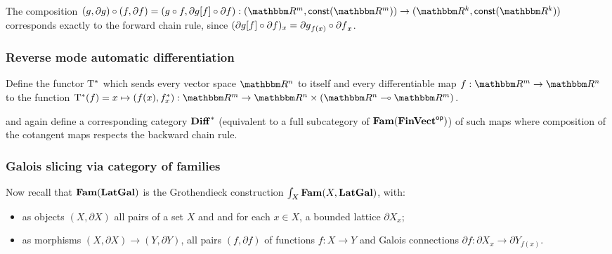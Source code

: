 \noindent The composition $(g, \partial g) \comp (f, \partial f) = (g \comp f, \reindex{\partial g}{f} \comp
\partial f): (\RR^m, \const(\RR^m)) \to (\RR^k, \const(\RR^k))$ corresponds exactly to the forward chain rule,
since $(\partial g[f] \circ \partial f)_x = {\partial g}_{f(x)} \circ {\partial f}_x$.

\subsubsection{Reverse mode automatic differentiation}

\begin{definition}
Define the functor $\mathrm{T}^*$ which sends every vector space $\RR^n$ to itself and every differentiable map
$f: \RR^m \to \RR^n$ to the function $\cotangents(f) = x \mapsto (f(x), \pullf{f}_x): \RR^m \to \RR^n \times
(\RR^n \linearto \RR^m)$.
\end{definition}

\noindent and again define a corresponding category $\mathbf{Diff}^*$ (equivalent to a full subcategory of
$\mathbf{Fam}(\mathbf{FinVect}^{\mathsf{op}})$) of such maps where composition of the cotangent maps respects the backward chain rule.


\subsubsection{Galois slicing via category of families}

Now recall that $\mathbf{Fam}(\mathbf{LatGal})$ is the Grothendieck construction $\int_{X}\mathbf{Fam}(X, \mathbf{LatGal})$, with:
\begin{itemize}
\item as objects $(X, \partial X)$ all pairs of a set $X$ and and for each $x \in X$, a bounded lattice
$\partial X_x$;
\item as morphisms $(X, \partial X) \to (Y, \partial Y)$, all pairs $(f, \partial f)$ of functions $f: X \to
Y$ and Galois connections $\partial f: \partial X_x \to \partial Y_{f(x)}$.
\end{itemize}
